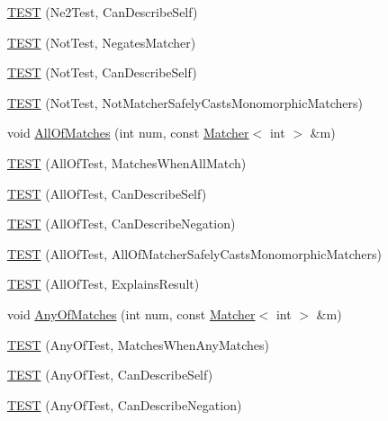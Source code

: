 \begin{DoxyCompactItemize}
\item 
\hyperlink{namespacetesting_1_1gmock__matchers__test_acedf2eda13385067ee70bdb7d6073427}{T\+E\+ST} (Ne2\+Test, Can\+Describe\+Self)
\item 
\hyperlink{namespacetesting_1_1gmock__matchers__test_ab41b57eeaea5568064b6ed3725316c73}{T\+E\+ST} (Not\+Test, Negates\+Matcher)
\item 
\hyperlink{namespacetesting_1_1gmock__matchers__test_a831db2bf90c3950953cdceaefebddd40}{T\+E\+ST} (Not\+Test, Can\+Describe\+Self)
\item 
\hyperlink{namespacetesting_1_1gmock__matchers__test_a46849e0c019e331f830ed91137fa417a}{T\+E\+ST} (Not\+Test, Not\+Matcher\+Safely\+Casts\+Monomorphic\+Matchers)
\item 
void \hyperlink{namespacetesting_1_1gmock__matchers__test_a51d8731c3824a6acdaa594645dd46779}{All\+Of\+Matches} (int num, const \hyperlink{classtesting_1_1_matcher}{Matcher}$<$ int $>$ \&m)
\item 
\hyperlink{namespacetesting_1_1gmock__matchers__test_a7714d041eb2dd2e233db7f175fedef5a}{T\+E\+ST} (All\+Of\+Test, Matches\+When\+All\+Match)
\item 
\hyperlink{namespacetesting_1_1gmock__matchers__test_a31056975d89eea2786997cf18b086bf4}{T\+E\+ST} (All\+Of\+Test, Can\+Describe\+Self)
\item 
\hyperlink{namespacetesting_1_1gmock__matchers__test_a86c15b3bc163321c7a56aeb0b1709b87}{T\+E\+ST} (All\+Of\+Test, Can\+Describe\+Negation)
\item 
\hyperlink{namespacetesting_1_1gmock__matchers__test_a4196a4000390e2378954d55b4f6d2893}{T\+E\+ST} (All\+Of\+Test, All\+Of\+Matcher\+Safely\+Casts\+Monomorphic\+Matchers)
\item 
\hyperlink{namespacetesting_1_1gmock__matchers__test_a2b9f4a791dd4f1fb9f8a1400883a5db4}{T\+E\+ST} (All\+Of\+Test, Explains\+Result)
\item 
void \hyperlink{namespacetesting_1_1gmock__matchers__test_aa4e9deb0a98413e62516451e7c060c7a}{Any\+Of\+Matches} (int num, const \hyperlink{classtesting_1_1_matcher}{Matcher}$<$ int $>$ \&m)
\item 
\hyperlink{namespacetesting_1_1gmock__matchers__test_a4949d40a1ac77182274189c21848af00}{T\+E\+ST} (Any\+Of\+Test, Matches\+When\+Any\+Matches)
\item 
\hyperlink{namespacetesting_1_1gmock__matchers__test_a00bd490bf974b3f3485a1b0fde9fa490}{T\+E\+ST} (Any\+Of\+Test, Can\+Describe\+Self)
\item 
\hyperlink{namespacetesting_1_1gmock__matchers__test_acc5e849e0765f00a48581e9480f3c8e2}{T\+E\+ST} (Any\+Of\+Test, Can\+Describe\+Negation)

\end{DoxyCompactItemize}
